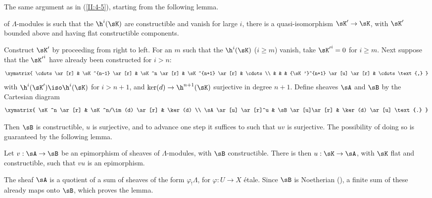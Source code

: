 The same argument as in (\ref{II:4-5}), starting from the following lemma.






\begin{lemma_}\label{II:4-7}
 of $\Lambda$-modules is such that the
$\h^i(\sK)$ are constructible and vanish for large $i$, there is a
quasi-isomorphism $\sK'\to \sK$, with $\sK'$ bounded above and having flat
constructible components.
\end{lemma_}

Construct $\sK'$ by proceeding from right to left. For an $m$ such that the
$\h^i(\sK)$ ($i\geqslant m$) vanish, take ${\sK'}^i = 0$ for
$i\geqslant m$. Next suppose that the ${\sK'}^i$ have already been
constructed for $i>n$:
\[\xymatrix{
  \cdots \ar[r]
    & \sK^{n-1} \ar[r]
    & \sK^n \ar[r]
    & \sK^{n+1} \ar[r]
    & \cdots \\
  & & & {\sK'}^{n+1} \ar[u] \ar[r]
    & \cdots \text{,}
}\]
with $\h^i(\sK')\iso \h^i(\sK)$ for $i>n+1$, and
$\ker(d)\to\h^{n+1}(\sK)$ surjective in degree $n+1$. Define sheaves $\sA$
and $\sB$ by the Cartesian diagram
\[\xymatrix{
  \sK^n \ar[r]
    & \sK^n/\im(d) \ar[r]
    & \ker(d) \\
  \sA \ar[u] \ar[r]^u
    & \sB \ar[u]\ar[r]
    & \ker(d) \ar[u] \text{.}
}\]

Then $\sB$ is constructible, $u$ is surjective, and to advance one step it
suffices to  such that $u v$ is surjective. The possibility of doing so
is guaranteed by the following lemma.






\begin{lemma_}\label{II:4-8}
Let $v:\sA\to \sB$ be an epimorphism of sheaves of $\Lambda$-modules, with
$\sB$ constructible. There is then $u:\sK\to \sA$, with $\sK$ flat and
constructible, such that $v u$ is an epimorphism.
\end{lemma_}

The sheaf $\sA$ is a quotient of a sum of sheaves of the form
$\varphi_! \Lambda$, for $\varphi:U\to X$ étale. Since $\sB$ is Noetherian
(\cite[IX.2.10]{sga4}), a finite sum of these already maps onto $\sB$, which
proves the lemma.






